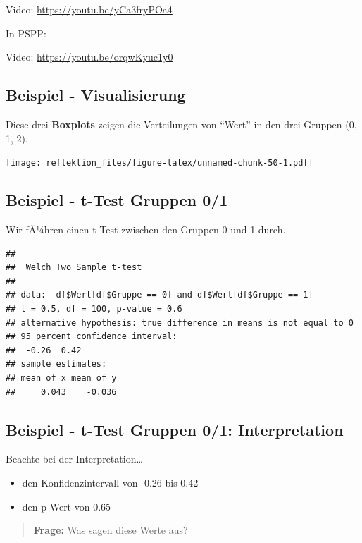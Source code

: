 \documentclass[
]{book}
\providecommand{\tightlist}{%
  \setlength{\itemsep}{0pt}\setlength{\parskip}{0pt}}
\begin{document}
Video: \url{https://youtu.be/yCa3fryPOa4}

In PSPP:

Video: \url{https://youtu.be/orqwKyuc1y0}

\hypertarget{beispiel---visualisierung}{%
\subsection{Beispiel - Visualisierung}\label{beispiel---visualisierung}}

Diese drei \textbf{Boxplots} zeigen die Verteilungen von ``Wert'' in den drei Gruppen (0, 1, 2).

\texttt{[image: reflektion\_files/figure-latex/unnamed-chunk-50-1.pdf]}

\hypertarget{beispiel---t-test-gruppen-01}{%
\subsection{Beispiel - t-Test Gruppen 0/1}\label{beispiel---t-test-gruppen-01}}

Wir fÃ¼hren einen t-Test zwischen den Gruppen 0 und 1 durch.

\begin{verbatim}
## 
##  Welch Two Sample t-test
## 
## data:  df$Wert[df$Gruppe == 0] and df$Wert[df$Gruppe == 1]
## t = 0.5, df = 100, p-value = 0.6
## alternative hypothesis: true difference in means is not equal to 0
## 95 percent confidence interval:
##  -0.26  0.42
## sample estimates:
## mean of x mean of y 
##     0.043    -0.036
\end{verbatim}

\hypertarget{beispiel---t-test-gruppen-01-interpretation}{%
\subsection{Beispiel - t-Test Gruppen 0/1: Interpretation}\label{beispiel---t-test-gruppen-01-interpretation}}

Beachte bei der Interpretation\ldots{}

\begin{itemize}
\tightlist
\item
  den Konfidenzintervall von -0.26 bis 0.42
\item
  den p-Wert von 0.65
\end{itemize}

\begin{quote}
\textbf{Frage:} Was sagen diese Werte aus?
\end{quote}
\end{document}
